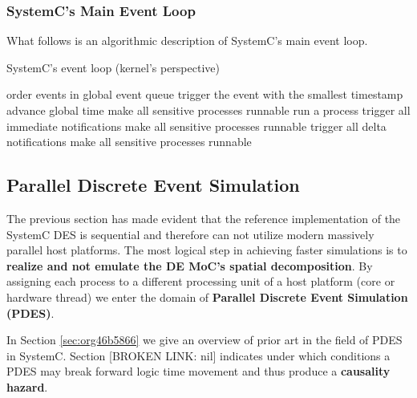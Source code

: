 \documentclass[11pt]{article}
\begin{document}
\subsubsection{SystemC's Main Event Loop}
\label{sec:org8b51f10}
What follows is an algorithmic description of SystemC's main event loop.
\begin{algorithm}
\caption{SystemC's event loop (kernel's perspective)}
\label{alg:kernel}
\begin{algorithmic}[1]

             
      \State order events in global event queue
      \State trigger the event with the smallest timestamp
      \State advance global time
      \State make all sensitive processes runnable
          
	     \State run a process
             \State trigger all immediate notifications
             \State make all sensitive processes runnable
         \EndWhile
	 \State trigger all delta notifications
         \State make all sensitive processes runnable
       \EndWhile
   \EndWhile

\end{algorithmic}
\end{algorithm}



\clearpage

\subsection{Parallel Discrete Event Simulation}
\label{sec:org5155b90}
The previous section has made evident that the reference implementation of the SystemC DES is sequential and therefore can not utilize modern massively parallel host platforms. 
The most logical step in achieving faster simulations is to \textbf{realize and not emulate the DE MoC's spatial decomposition}.
By assigning each process to a different processing unit of a host platform (core or hardware thread) we enter the domain of \textbf{Parallel Discrete Event Simulation (PDES)}.

In Section \ref{sec:org46b5866} we give an overview of prior art in the field of PDES in SystemC.
Section [BROKEN LINK: nil] indicates under which conditions a PDES may break forward logic time movement and thus produce a \textbf{causality hazard}.
\end{document}
